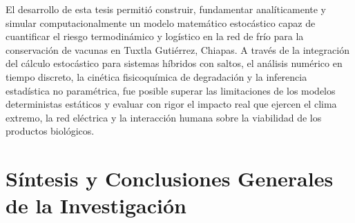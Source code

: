 \documentclass[
  spanish,
  letterpaper,
  DIV=11,
  numbers=noendperiod]{scrreprt}
\theoremstyle{plain}
\theoremstyle{plain}
\theoremstyle{plain}
\theoremstyle{definition}
\theoremstyle{remark}
\begin{document}
El desarrollo de esta tesis permitió construir, fundamentar
analíticamente y simular computacionalmente un modelo matemático
estocástico capaz de cuantificar el riesgo termodinámico y logístico en
la red de frío para la conservación de vacunas en Tuxtla Gutiérrez,
Chiapas. A través de la integración del cálculo estocástico para
sistemas híbridos con saltos, el análisis numérico en tiempo discreto,
la cinética fisicoquímica de degradación y la inferencia estadística no
paramétrica, fue posible superar las limitaciones de los modelos
deterministas estáticos y evaluar con rigor el impacto real que ejercen
el clima extremo, la red eléctrica y la interacción humana sobre la
viabilidad de los productos biológicos.

\section{Síntesis y Conclusiones Generales de la
Investigación}\label{suxedntesis-y-conclusiones-generales-de-la-investigaciuxf3n}
\end{document}
